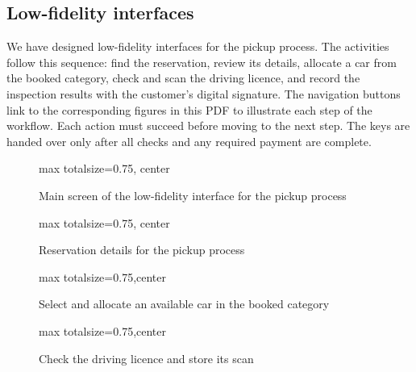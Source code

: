 \documentclass[12pt,a4paper]{report}
\begin{document}
\subsection{Low-fidelity interfaces}
We have designed low-fidelity interfaces for the pickup process.
The activities follow this sequence: find the reservation, review its details, allocate a car from the booked category,
check and scan the driving licence, and record the inspection results with the customer's digital signature.
The navigation buttons link to the corresponding figures in this PDF to illustrate each step of the workflow.
Each action must succeed before moving to the next step.
The keys are handed over only after all checks and any required payment are complete.

\begin{figure}[H]
    \centering
    \begin{adjustbox}{
        max totalsize={\textwidth}{0.75\textheight},
        center
    }
    \end{adjustbox}
    \caption{Main screen of the low-fidelity interface for the pickup process}
    \label{fig:lofi-ui-main}
\end{figure}
\begin{figure}[H]
    \centering
    \begin{adjustbox}{
        max totalsize={\textwidth}{0.75\textheight},
        center
    }
    \end{adjustbox}
    \caption{Reservation details for the pickup process}
    \label{fig:lofi-ui-reservation-details}
\end{figure}

\begin{figure}[H]
    \centering
    \begin{adjustbox}{max totalsize={\textwidth}{0.75\textheight},center}
    \end{adjustbox}
    \caption{Select and allocate an available car in the booked category}
    \label{fig:lofi-ui-car-allocation}
\end{figure}

\begin{figure}[H]
    \centering
    \begin{adjustbox}{max totalsize={\textwidth}{0.75\textheight},center}
    \end{adjustbox}
    \caption{Check the driving licence and store its scan}
    \label{fig:lofi-ui-driving-licence}
\end{figure}
\end{document}
